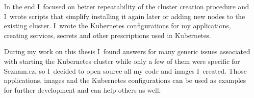 In the end I~focused on better repeatability of the cluster creation procedure and I~wrote scripts that simplify installing it again later or adding new nodes to the existing cluster. I~wrote the Kubernetes configurations for my applications, creating services, secrets and other prescriptions used in Kubernetes.

During my work on this thesis I~found answers for many generic issues associated with starting the Kubernetes cluster while only a few of them were specific for Seznam.cz, so I~decided to open source all my code and images I~created. Those applications, images and the Kubernetes configurations can be used as examples for further development and can help others as well.
